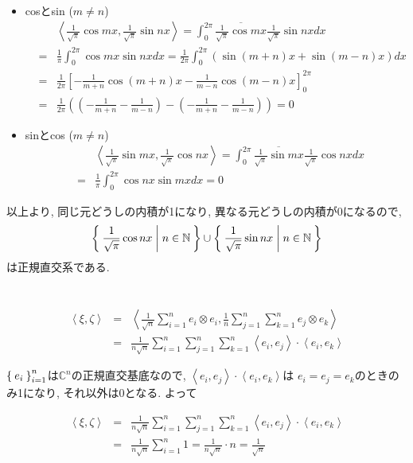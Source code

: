 \documentclass[a4paper,11pt]{jsarticle}
\begin{document}
\begin{itemize}
\begin{eqnarray*}
    \end{eqnarray*}
  \item cosとsin ($m \neq n$)
    \begin{eqnarray*}
      && \left<\frac{1}{\sqrt{\pi}}\cos{mx}, \frac{1}{\sqrt{\pi}}\sin{nx}\right>
      = \int_{0}^{2\pi}{\overline{\frac{1}{\sqrt{\pi}}\cos{mx}}\frac{1}{\sqrt{\pi}}\sin{nx}}dx \\
      &=& \frac{1}{\pi}\int_{0}^{2\pi}{\cos{mx}\sin{nx}}dx
      = \frac{1}{2\pi}\int_{0}^{2\pi}{\left(\sin{(m + n)x} + \sin{(m - n)x}\right)}dx \\
      &=& \frac{1}{2\pi}\left[-\frac{1}{m + n}\cos{(m + n)x} - \frac{1}{m - n}\cos{(m - n)x}\right]_{0}^{2\pi} \\
      &=& \frac{1}{2\pi}\left(\left(-\frac{1}{m + n} -\frac{1}{m - n}\right)-\left(-\frac{1}{m + n} -\frac{1}{m - n}\right)\right) = 0
    \end{eqnarray*}
  \item sinとcos ($m \neq n$)
    \begin{eqnarray*}
      && \left<\frac{1}{\sqrt{\pi}}\sin{mx}, \frac{1}{\sqrt{\pi}}\cos{nx}\right>
      = \int_{0}^{2\pi}{\overline{\frac{1}{\sqrt{\pi}}\sin{mx}}\frac{1}{\sqrt{\pi}}\cos{nx}}dx \\
      &=& \frac{1}{\pi}\int_{0}^{2\pi}{\cos{nx}\sin{mx}}dx
      = 0
    \end{eqnarray*}
\end{itemize}
以上より, 同じ元どうしの内積が1になり, 
異なる元どうしの内積が0になるので, 
\[
  \Set{\frac{1}{\sqrt{\pi}}\cos{nx} | n \in \mathbb{N}}
  \cup \Set{\frac{1}{\sqrt{\pi}}\sin{nx} | n \in \mathbb{N}}
\]
は正規直交系である.

\section{}
\begin{eqnarray*}
  \left<\xi, \zeta\right> &=& \left<
    \frac{1}{\sqrt{n}}\sum_{i=1}^{n}e_i \otimes e_i,
    \frac{1}{n}\sum_{j=1}^{n}\sum_{k=1}^{n}e_j \otimes e_k
  \right> \\
  &=& \frac{1}{n\sqrt{n}}\sum_{i=1}^n\sum_{j=1}^n\sum_{k=1}^n
  \left<e_i, e_j\right> \cdot \left<e_i, e_k\right>
\end{eqnarray*}

$\Set{e_i}_{i=1}^n$は$\mathbb{C}^n$の正規直交基底なので, 
$\left<e_i, e_j\right> \cdot \left<e_i, e_k\right>$は
$e_i = e_j = e_k$のときのみ1になり, それ以外は0となる.
よって

\begin{eqnarray*}
  \left<\xi, \zeta\right>
  &=& \frac{1}{n\sqrt{n}}\sum_{i=1}^n\sum_{j=1}^n\sum_{k=1}^n
    \left<e_i, e_j\right> \cdot \left<e_i, e_k\right> \\
  &=& \frac{1}{n\sqrt{n}}\sum_{i=1}^{n}{1}
    = \frac{1}{n\sqrt{n}} \cdot n = \frac{1}{\sqrt{n}}
\end{eqnarray*}
\end{document}
